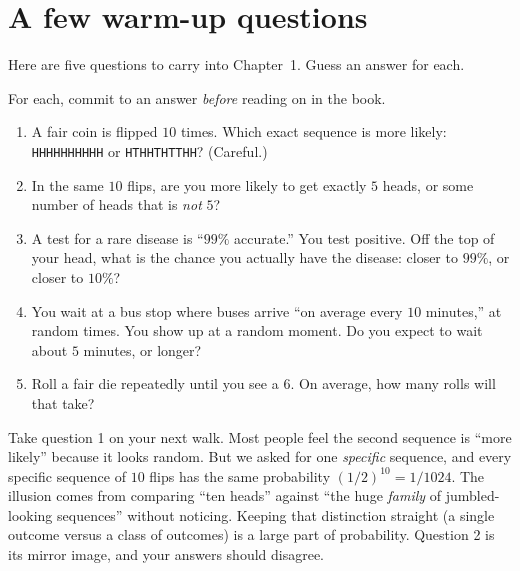 \section*{A few warm-up questions}
\label{ch00:warmup}

Here are five questions to carry into Chapter~1. Guess an answer for each.

\begin{exercise}
\label{ch00:ex-guess}
For each, commit to an answer \emph{before} reading on in the book.
\begin{enumerate}
  \item A fair coin is flipped $10$ times. Which exact sequence is more likely:
    \texttt{HHHHHHHHHH} or \texttt{HTHHTHTTHH}? (Careful.)
  \item In the same $10$ flips, are you more likely to get exactly $5$ heads, or
    some number of heads that is \emph{not} $5$?
  \item A test for a rare disease is ``$99\%$ accurate.'' You test positive. Off
    the top of your head, what is the chance you actually have the disease:
    closer to $99\%$, or closer to $10\%$?
  \item You wait at a bus stop where buses arrive ``on average every $10$
    minutes,'' at random times. You show up at a random moment. Do you expect to
    wait about $5$ minutes, or longer?
  \item Roll a fair die repeatedly until you see a $6$. On average, how many
    rolls will that take?
\end{enumerate}
\end{exercise}

\begin{walkbox}
Take question 1 on your next walk. Most people feel the second sequence is
``more likely'' because it looks random. But we asked for one \emph{specific}
sequence, and every specific sequence of $10$ flips has the same probability
$(1/2)^{10} = 1/1024$. The illusion comes from comparing ``ten heads'' against
``the huge \emph{family} of jumbled-looking sequences'' without noticing.
Keeping that distinction straight (a single outcome versus a class of
outcomes) is a large part of probability. Question 2 is its mirror image, and
your answers should disagree.
\end{walkbox}

